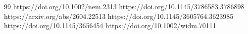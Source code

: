 \documentclass[conference]{IEEEtran}
\begin{document}
\begin{thebibliography}{99}
 https://doi.org/10.1002/nem.2313
 https://doi.org/10.1145/3786583.3786898
 https://arxiv.org/abs/2604.22513
 https://doi.org/10.1145/3605764.3623985
 https://doi.org/10.1145/3656454
 https://doi.org/10.1002/widm.70111
\end{thebibliography}
\end{document}

